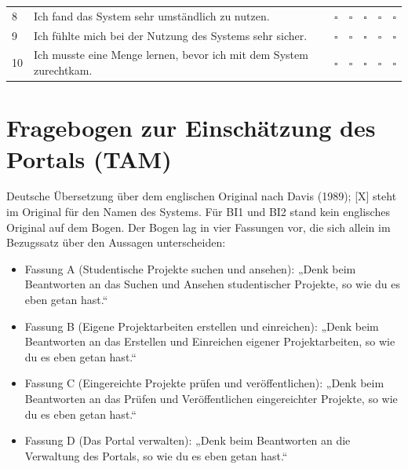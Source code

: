 \begin{longtable}{@{}L{0.7cm}L{9.6cm}*{5}{>{\centering\arraybackslash}p{0.62cm}}@{}}
	8 & Ich fand das System sehr umständlich zu nutzen.  & $\square$ & $\square$ & $\square$ & $\square$ & $\square$ \\
	9 & Ich fühlte mich bei der Nutzung des Systems sehr sicher.  & $\square$ & $\square$ & $\square$ & $\square$ & $\square$ \\
	10 & Ich musste eine Menge lernen, bevor ich mit dem System zurechtkam.  & $\square$ & $\square$ & $\square$ & $\square$ & $\square$ \\
\end{longtable}
\endgroup

\section*{Fragebogen zur Einschätzung des Portals (TAM)}

Deutsche Übersetzung über dem englischen Original nach Davis (1989); [X] steht im Original für den Namen des Systems. Für BI1 und BI2 stand kein englisches Original auf dem Bogen. Der Bogen lag in vier Fassungen vor, die sich allein im Bezugssatz über den Aussagen unterscheiden:

\begin{itemize}[topsep=0.3em, itemsep=0.2em]
	\item Fassung A (Studentische Projekte suchen und ansehen): „Denk beim Beantworten an das Suchen und Ansehen studentischer Projekte, so wie du es eben getan hast.“
	\item Fassung B (Eigene Projektarbeiten erstellen und einreichen): „Denk beim Beantworten an das Erstellen und Einreichen eigener Projektarbeiten, so wie du es eben getan hast.“
	\item Fassung C (Eingereichte Projekte prüfen und veröffentlichen): „Denk beim Beantworten an das Prüfen und Veröffentlichen eingereichter Projekte, so wie du es eben getan hast.“
	\item Fassung D (Das Portal verwalten): „Denk beim Beantworten an die Verwaltung des Portals, so wie du es eben getan hast.“
\end{itemize}

